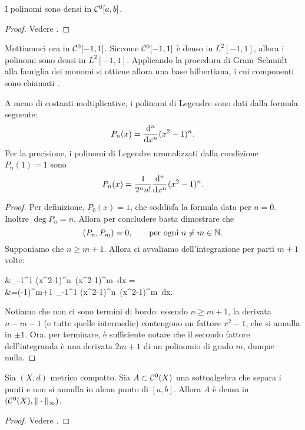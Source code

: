 \begin{theorem}[Weierstrass]
	I polinomi sono densi in $\mathcal{C}^0[a,b]$.
\end{theorem}
\begin{proof}
	Vedere \cite{rudin1991functional}.
\end{proof}

Mettiamoci ora in $\mathcal{C}^0[-1,1]$. Siccome $\mathcal{C}^0[-1,1]$ è denso in $L^2[-1,1]$, allora i polinomi sono densi in $L^2[-1,1]$. Applicando la procedura di Gram--Schmidt alla famiglia dei monomi si ottiene allora una base hilbertiana, i cui componenti sono chiamati .

\begin{theorem}
	A meno di costanti moltiplicative, i polinomi di Legendre sono dati dalla formula seguente:
	\begin{equation*}
		P_n(x) = \frac{\mathrm{d}{^n}}{\mathrm{d}{x^n}} (x^2-1)^n.
	\end{equation*}
	Per la precisione, i polinomi di Legendre nromalizzati dalla condizione $P_n(1) =1$ sono
	\begin{equation*}
		P_n(x) = \frac1{2^n n!} \frac{\mathrm{d}{^n}}{\mathrm{d}{x^n}} (x^2-1)^n.
	\end{equation*}
\end{theorem}
\begin{proof}
	Per definizione, $P_0(x) = 1$, che soddisfa la formula data per $n=0$. Inoltre $\deg P_n = n$.
	Allora per concludere basta dimostrare che
	\begin{equation*}
		(P_n, P_m) = 0, \qquad \text{per ogni $n \neq m \in \mathbb{N}$}.
	\end{equation*}
	Supponiamo che $n \geq m+1$. Allora ci avvaliamo dell'integrazione per parti $m+1$ volte:
	\begin{eqalign*}
		&\int_{-1}^1  (x^2-1)^n\,  (x^2-1)^m \,dx =\\
		&=(-1)^{m+1} \int_{-1}^1  (x^2-1)^n\,  (x^2-1)^m \,dx.
	\end{eqalign*}
	Notiamo che non ci sono termini di bordo: essendo $n \geq m+1$, la derivata $n-m-1$ (e tutte quelle intermedie) contengono un fattore $x^2-1$, che si annulla in $\pm 1$.
	Ora, per terminare, è sufficiente notare che il secondo fattore dell'integranda è una derivata $2m+1$ di un polinomio di grado $m$, dunque nulla.
\end{proof}

\begin{theorem}
	Sia $(X,d)$ metrico compatto. Sia $A \subset \mathcal{C}^0(X)$ una sottoalgebra che separa i punti e non si annulla in alcun punto di $[a,b]$.
	Allora $A$ è densa in $(\mathcal{C}^0(X), \|\cdot\|_\infty)$.
\end{theorem}
\begin{proof}
	Vedere \cite{rudin1991functional}.
\end{proof}

